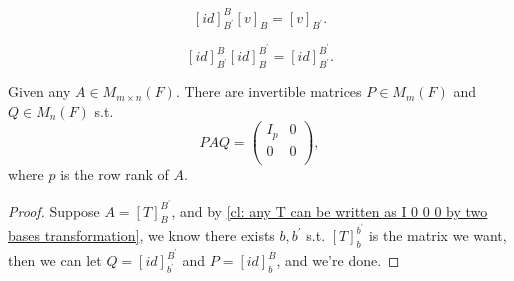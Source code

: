 \begin{corollary}
    \[
        [id]_{B^{\prime} }^{B} [v]_B = [v]_{B^{\prime} }.
    \]
\end{corollary}

\begin{corollary}
    \[
        [id]_{B^{\prime} }^{B}[id]_{B}^{B^{\prime} } = [id]_{B^{\prime} }^{B^{\prime}} .
    \]
\end{corollary}


\begin{corollary}
    Given any \(A \in M_{m \times n}(F)\). There are invertible matrices \(P \in M_m(F)\) and \(Q \in M_n(F)\) s.t. 
    \[
        PAQ = \begin{pmatrix}
            I_p & 0  \\
            0 & 0  \\
        \end{pmatrix},
    \] where \(p\) is the row rank of \(A\).   
\end{corollary}
\begin{proof}
   Suppose \(A = [T]_{B}^{B^{\prime} }\), and by \autoref{cl: any T can be written as I 0 0 0 by two bases transformation}, we know there exists \(b, b^{\prime} \) s.t. \([T]_{b}^{b^{\prime} }\) is the matrix we want, then we can let \(Q = [id]_{b^{\prime} }^{B^{\prime} }\) and \(P = [id]_{b}^{B}\), and we're done.       
\end{proof}
